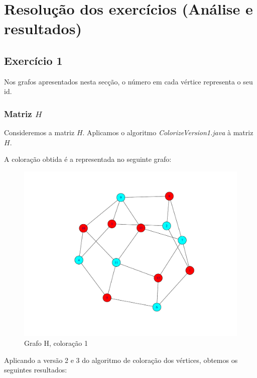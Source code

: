 \documentclass[a4paper,12pt]{report}
\begin{document}
\chapter{Resolução dos exercícios (Análise e resultados)}

\section{Exercício 1}

Nos grafos apresentados nesta secção, o número em cada vértice representa o seu id.

\subsection*{Matriz $H$}

Consideremos a matriz $H$. Aplicamos o algoritmo \textit{ColorizeVersion1.java} à matriz $H$.

A coloração obtida é a representada no seguinte grafo:

\begin{figure}[H]
    \centering
        \includegraphics[scale=0.25]{img/v1H.pdf}
    \caption{Grafo H, coloração 1}
    \label{fig:v1H}
\end{figure}

Aplicando a versão 2 e 3 do algoritmo de coloração dos vértices, obtemos os seguintes resultados:
\end{document}
